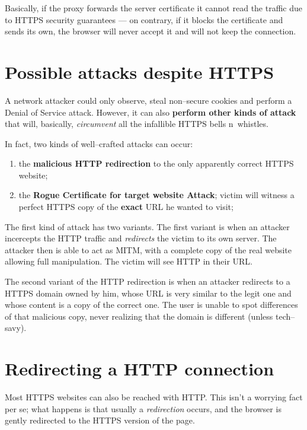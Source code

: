 \documentclass[10pt]{\classname}
\begin{document}
Basically, if the proxy forwards the server certificate it cannot read the
traffic due to HTTPS security guarantees --- on contrary, if it blocks the
certificate and sends its own, the browser will never accept it and will not
keep the connection.

\section{Possible attacks despite HTTPS}

A network attacker could only observe, steal non--secure cookies and perform a
Denial of Service attack. However, it can also \textbf{perform other kinds of
attack} that will, basically, \emph{circumvent} all the infallible HTTPS
bells n\textquotesingle\  whistles.

In fact, two kinds of well--crafted attacks can occur:
\begin{enumerate}
    \item the \textbf{malicious HTTP redirection} to the only apparently correct
        HTTPS website;
    \item the \textbf{Rogue Certificate for target website Attack}; victim will
        witness a perfect HTTPS copy of the \textbf{exact} URL he wanted to
        visit;
\end{enumerate}

The first kind of attack has two variants. The first variant is when an
attacker incercepts the HTTP traffic and \emph{redirects} the victim to its own
server. The attacker then is able to act as MITM, with a complete copy of the
real website allowing full manipulation. The victim will see HTTP in their URL.

The second variant of the HTTP redirection is when an attacker redirects to a
HTTPS domain owned by him, whose URL is very similar to the legit one and whose
content is a copy of the correct one. The user is unable to spot differences of
that malicious copy, never realizing that the domain is different (unless
tech--savy).

\section{Redirecting a HTTP connection}

Most HTTPS websites can also be reached with HTTP. This isn't a worrying fact
per se; what happens is that usually a \emph{redirection} occurs, and the
browser is gently redirected to the HTTPS version of the page.
\end{document}
